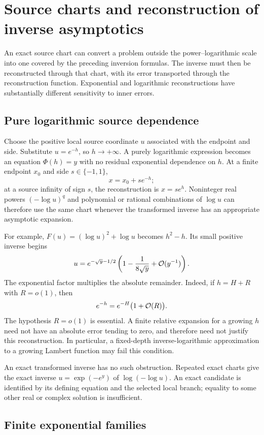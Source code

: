 \section{Source charts and reconstruction of inverse asymptotics}
\label{sec:source-chart-implementation}

An exact source chart can convert a problem outside the power--logarithmic
scale into one covered by the preceding inversion formulas. The inverse
must then be reconstructed through that chart, with its error transported
through the reconstruction function. Exponential and logarithmic
reconstructions have substantially different sensitivity to inner errors.

\subsection{Pure logarithmic source dependence}

Choose the positive local source coordinate $u$ associated with the endpoint
and side. Substitute $u=e^{-h}$, so $h\to+\infty$. A purely logarithmic
expression becomes an equation $\Phi(h)=y$ with no residual exponential
dependence on $h$. At a finite endpoint $x_0$ and side $s\in\{-1,1\}$,
\[
 x=x_0+s e^{-h};
\]
at a source infinity of sign $s$, the reconstruction is $x=s e^h$.
Noninteger real powers $(-\log u)^q$ and polynomial or rational combinations
of $\log u$ can therefore use the same chart whenever the transformed
inverse has an appropriate asymptotic expansion.

For example, $F(u)=(\log u)^2+\log u$ becomes $h^2-h$. Its small
positive inverse begins
\[
 u=e^{-\sqrt y-1/2}
 \left(1-\frac1{8\sqrt y}+\mathcal O(y^{-1})\right).
\]
The exponential factor multiplies the absolute remainder. Indeed, if
$h=H+R$ with $R=o(1)$, then
\[
 e^{-h}=e^{-H}\bigl(1+\mathcal O(R)\bigr).
\]
The hypothesis $R=o(1)$ is essential. A finite relative expansion for a
growing $h$ need not have an absolute error tending to zero, and therefore
need not justify this reconstruction. In particular, a fixed-depth
inverse-logarithmic approximation to a growing Lambert function may fail
this condition.

An exact transformed inverse has no such obstruction. Repeated exact
charts give the exact inverse $u=\exp(-e^y)$ of $\log(-\log u)$.
An exact candidate is identified by its defining equation and the selected
local branch; equality to some other real or complex solution is insufficient.

\subsection{Finite exponential families}

